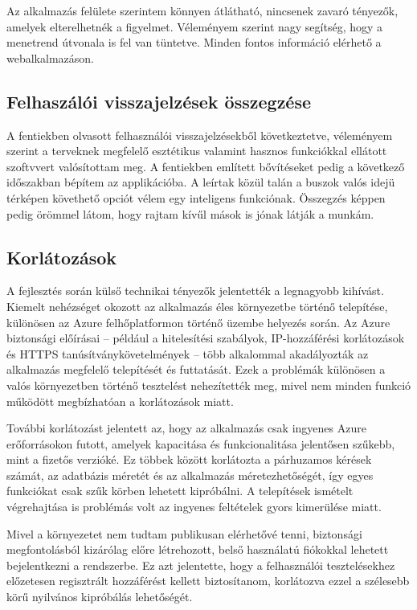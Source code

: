 Az alkalmazás felülete szerintem könnyen átlátható, nincsenek zavaró tényezők, amelyek elterelhetnék a figyelmet. Véleményem szerint nagy segítség, hogy a menetrend útvonala is fel van tüntetve. Minden fontos információ elérhető a webalkalmazáson.

\subsection{Felhaszálói visszajelzések összegzése}
A fentiekben olvasott felhasználói visszajelzésekből következtetve, véleményem szerint a terveknek megfelelő esztétikus valamint hasznos funkciókkal ellátott szoftvvert valósítottam meg. A fentiekben említett bővítéseket pedig a következő időszakban bépítem az applikációba. A leírtak közül talán a buszok valós idejü térképen követhető opciót vélem egy inteligens funkciónak. Összegzés képpen pedig örömmel látom, hogy rajtam kívűl mások is jónak látják a munkám.

\subsection{Korlátozások}

A fejlesztés során külső technikai tényezők jelentették a legnagyobb kihívást. Kiemelt nehézséget okozott az alkalmazás éles környezetbe történő telepítése, különösen az Azure felhőplatformon történő üzembe helyezés során. Az Azure biztonsági előírásai – például a hitelesítési szabályok, IP-hozzáférési korlátozások és HTTPS tanúsítványkövetelmények – több alkalommal akadályozták az alkalmazás megfelelő telepítését és futtatását. Ezek a problémák különösen a valós környezetben történő tesztelést nehezítették meg, mivel nem minden funkció működött megbízhatóan a korlátozások miatt.

További korlátozást jelentett az, hogy az alkalmazás csak ingyenes Azure erőforrásokon futott, amelyek kapacitása és funkcionalitása jelentősen szűkebb, mint a fizetős verzióké. Ez többek között korlátozta a párhuzamos kérések számát, az adatbázis méretét és az alkalmazás méretezhetőségét, így egyes funkciókat csak szűk körben lehetett kipróbálni. A telepítések ismételt végrehajtása is problémás volt az ingyenes feltételek gyors kimerülése miatt.

Mivel a környezetet nem tudtam publikusan elérhetővé tenni, biztonsági megfontolásból kizárólag előre létrehozott, belső használatú fiókokkal lehetett bejelentkezni a rendszerbe. Ez azt jelentette, hogy a felhasználói tesztelésekhez előzetesen regisztrált hozzáférést kellett biztosítanom, korlátozva ezzel a szélesebb körű nyilvános kipróbálás lehetőségét.

